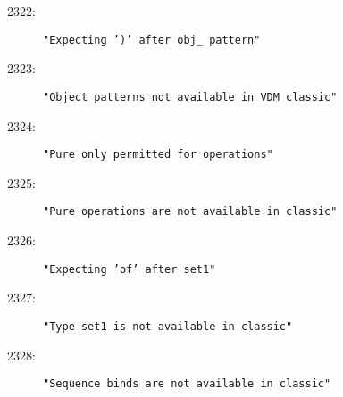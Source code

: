 \begin{description}
\item[2322:] \texttt{"Expecting ')' after obj_ pattern"}
\item[2323:] \texttt{"Object patterns not available in VDM classic"}
\item[2324:] \texttt{"Pure only permitted for operations"}
\item[2325:] \texttt{"Pure operations are not available in classic"}
\item[2326:] \texttt{"Expecting 'of' after set1"}
\item[2327:] \texttt{"Type set1 is not available in classic"}
\item[2328:] \texttt{"Sequence binds are not available in classic"}

\end{description}
